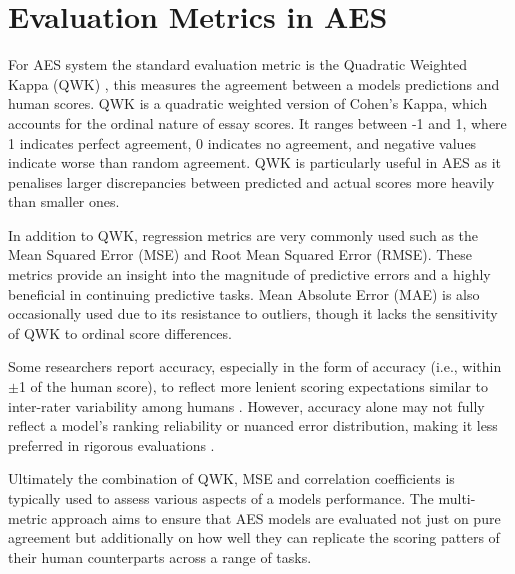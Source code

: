 \documentclass[10pt]{report}
\begin{document}
\section{Evaluation Metrics in AES}
For AES system the standard evaluation metric is the Quadratic Weighted Kappa (QWK) \parencite{cohen1968kappa}, this measures the agreement between a models predictions and human scores. QWK is a quadratic weighted version of Cohen's Kappa, which accounts for the ordinal nature of essay scores. It ranges between -1 and 1, where 1 indicates perfect agreement, 0 indicates no agreement, and negative values indicate worse than random agreement. QWK is particularly useful in AES as it penalises larger discrepancies between predicted and actual scores more heavily than smaller ones.

In addition to QWK, regression metrics are very commonly used such as the Mean Squared Error (MSE) and Root Mean Squared Error (RMSE).  These metrics provide an insight into the magnitude of predictive errors and a highly beneficial in continuing predictive tasks. Mean Absolute Error (MAE) is also occasionally used due to its resistance to outliers, though it lacks the sensitivity of QWK to ordinal score differences.

Some researchers report accuracy, especially in the form of  accuracy (i.e., within $\pm$1 of the human score), to reflect more lenient scoring expectations similar to inter-rater variability among humans \parencite{Shermis2013,taghipour2016neural}. However, accuracy alone may not fully reflect a model’s ranking reliability or nuanced error distribution, making it less preferred in rigorous evaluations 
\parencite{Williamson2012,Yannakoudakis2011}.

Ultimately the combination of QWK, MSE and correlation coefficients is typically used to assess various aspects of a models performance. The multi-metric approach aims to ensure that AES models are evaluated not just on pure agreement but additionally on how well they can replicate the scoring patters of their human counterparts across a range of tasks.
\end{document}
